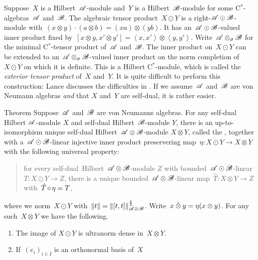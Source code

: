 \documentclass[b]{subfiles}
\begin{document}
\begin{parsec}%
\begin{point}%
Suppose~$X$ is a Hilbert~$\mathscr{A}$-module
    and~$Y$ is a Hilbert~$\mathscr{B}$-module
    for some C$^*$-algebras~$\mathscr{A}$ and~$\mathscr{B}$.
The algebraic tensor product~$X \odot Y$
    is a right-$\mathscr{A} \odot \mathscr{B}$-module
    with~$(x\otimes y)\cdot (a\otimes b) = (xa) \otimes (yb)$.
It has an~$\mathscr{A} \odot \mathscr{B}$-valued inner
    product fixed by~$[x\otimes y, x'\otimes y']
        = \left<x,x'\right> \otimes \left<y,y'\right>$.
Write~$\mathscr{A} \otimes_\sigma \mathscr{B}$ for the minimal
    C$^*$-tensor product of~$\mathscr{A}$ and~$\mathscr{B}$.
The inner product on~$X \odot Y$ can be extended
    to an~$\mathscr{A} \otimes_\sigma \mathscr{B}$-valued inner product
    on the norm completion of~$X \odot Y$
    on which it is definite.
This is a Hilbert C$^*$-module,
    which is called the \emph{exterior tensor product} of~$X$ and~$Y$.
It is quite difficult to perform this construction:
    Lance discusses the difficulties in \cite[Ch.~4]{lance}.
If we assume~$\mathscr{A}$ and~$\mathscr{B}$ are von Neumann algebras
    \emph{and} that $X$ and~$Y$ are self-dual,
    it is rather easier.
\end{point}
\begin{point}{Theorem}%
Suppose~$\mathscr{A}$ and~$\mathscr{B}$ are von Neumanns algebras.
For any self-dual Hilbert $\mathscr{A}$-module $X$
    and self-dual Hilbert~$\mathscr{B}$-module $Y$,
    there is an up-to-isomorphism unique
    self-dual Hilbert~$\mathscr{A}\otimes \mathscr{B}$-module
    $X \otimes Y$, called the ,
    together with a~$\mathscr{A} \odot \mathscr{B}$-linear injective
    inner product preservering map~$\eta \colon X \odot Y \to X\otimes Y$
    with the following universal property:
    \begin{quote}
    for every self-dual~Hilbert~$\mathscr{A}\otimes\mathscr{B}$-module
    $Z$ with bounded~$\mathscr{A} \odot \mathscr{B}$-linear
        $T\colon X \odot Y \to Z$,
    there is a unique bounded~$\mathscr{A} \otimes \mathscr{B}$-linear
        map~$\hat{T}\colon X \otimes Y \to Z$
    with~$\hat{T} \mathop{\circ} \eta= T$,
    \end{quote}
where we norm~$X \odot Y$ with~$\|t \| = \|[t,t]\|^{\frac{1}{2}}_{\mathscr{A}\otimes \mathscr{B}}$.
Write~$x \mathbin{\hat{\otimes}} y = \eta(x\otimes y)$.
For any such~$X \otimes Y$ we have the following.
\begin{enumerate}
    \item The image of $X \odot Y$ is ultranorm dense in~$X \otimes Y$.
    \item If~$(e_i)_{i \in I}$ is an orthonormal basis of~$X$

\end{enumerate}
\end{point}
\end{parsec}
\end{document}
